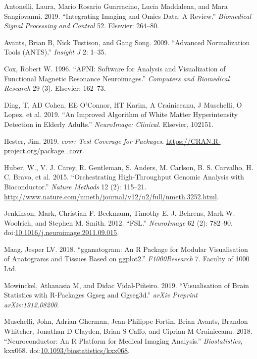 \documentclass[]{elsarticle} %
\begin{document}
\hypertarget{refs}{}
\hypertarget{ref-antonelli2019integrating}{}
Antonelli, Laura, Mario Rosario Guarracino, Lucia Maddalena, and Mara
Sangiovanni. 2019. ``Integrating Imaging and Omics Data: A Review.''
\emph{Biomedical Signal Processing and Control} 52. Elsevier: 264--80.

\hypertarget{ref-avants2009advanced}{}
Avants, Brian B, Nick Tustison, and Gang Song. 2009. ``Advanced
Normalization Tools (ANTS).'' \emph{Insight J} 2: 1--35.

\hypertarget{ref-afni}{}
Cox, Robert W. 1996. ``AFNI: Software for Analysis and Visualization of
Functional Magnetic Resonance Neuroimages.'' \emph{Computers and
Biomedical Research} 29 (3). Elsevier: 162--73.

\hypertarget{ref-ding2019improved}{}
Ding, T, AD Cohen, EE O'Connor, HT Karim, A Crainiceanu, J Muschelli, O
Lopez, et al. 2019. ``An Improved Algorithm of White Matter
Hyperintensity Detection in Elderly Adults.'' \emph{NeuroImage:
Clinical}. Elsevier, 102151.

\hypertarget{ref-covr}{}
Hester, Jim. 2019. \emph{covr: Test Coverage for Packages}.
\url{https://CRAN.R-project.org/package=covr}.

\hypertarget{ref-bioconductor}{}
Huber, W., V. J. Carey, R. Gentleman, S. Anders, M. Carlson, B. S.
Carvalho, H. C. Bravo, et al. 2015. ``Orchestrating High-Throughput
Genomic Analysis with Bioconductor.'' \emph{Nature Methods} 12 (2):
115--21.
\url{http://www.nature.com/nmeth/journal/v12/n2/full/nmeth.3252.html}.

\hypertarget{ref-fsl}{}
Jenkinson, Mark, Christian F. Beckmann, Timothy E. J. Behrens, Mark W.
Woolrich, and Stephen M. Smith. 2012. ``FSL.'' \emph{NeuroImage} 62 (2):
782--90.
doi:\href{https://doi.org/10.1016/j.neuroimage.2011.09.015}{10.1016/j.neuroimage.2011.09.015}.

\hypertarget{ref-maag2018gganatogram}{}
Maag, Jesper LV. 2018. ``gganatogram: An R Package for Modular
Visualisation of Anatograms and Tissues Based on ggplot2.''
\emph{F1000Research} 7. Faculty of 1000 Ltd.

\hypertarget{ref-mowinckel2019visualisation}{}
Mowinckel, Athanasia M, and Didac Vidal-Piñeiro. 2019. ``Visualisation
of Brain Statistics with R-Packages Ggseg and Ggseg3d.'' \emph{arXiv
Preprint arXiv:1912.08200}.

\hypertarget{ref-neuroconductor}{}
Muschelli, John, Adrian Gherman, Jean-Philippe Fortin, Brian Avants,
Brandon Whitcher, Jonathan D Clayden, Brian S Caffo, and Ciprian M
Crainiceanu. 2018. ``Neuroconductor: An R Platform for Medical Imaging
Analysis.'' \emph{Biostatistics}, kxx068.
doi:\href{https://doi.org/10.1093/biostatistics/kxx068}{10.1093/biostatistics/kxx068}.
\end{document}
